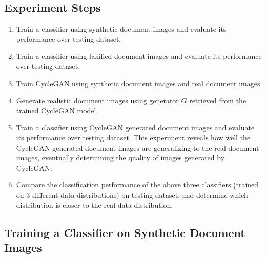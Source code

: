 \subsection{Experiment Steps}
\begin{enumerate}
    \itemsep0em 
    \item Train a classifier using synthetic document images and evaluate its performance over testing dataset.
    \item Train a classifier using faxified document images and evaluate its performance over testing dataset.
    \item Train \ac{CycleGAN} using synthetic document images and real document images.
    \item Generate realistic document images using generator $G$ retrieved from the trained \ac{CycleGAN} model.
    \item Train a classifier using \ac{CycleGAN} generated document images and evaluate its performance over testing dataset. This experiment reveals how well the \ac{CycleGAN} generated document images are generalizing to the real document images, eventually determining the quality of images generated by \ac{CycleGAN}.
    \item Compare the classification performance of the above three classifiers (trained on 3 different data distributions) on testing dataset, and determine which distribution is closer to the real data distribution.
\end{enumerate}



\subsection{Training a Classifier on Synthetic Document Images}\label{trainingsyntheticclassifier}

